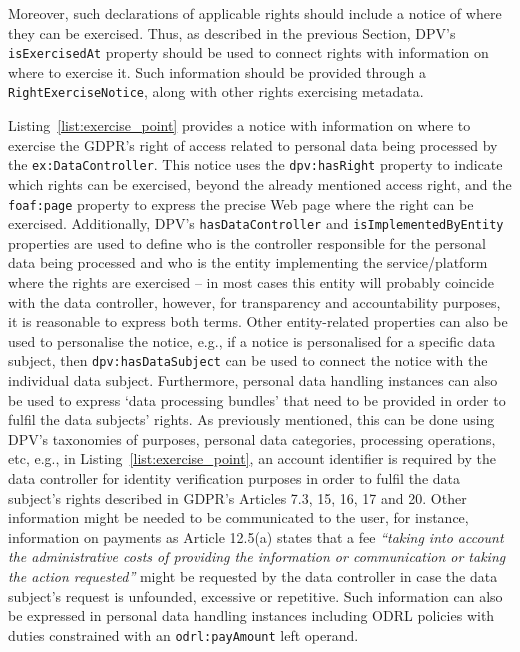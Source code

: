 Moreover, such declarations of applicable rights should include a notice of where they can be exercised.
Thus, as described in the previous Section, DPV’s \texttt{isExercisedAt} property should be used to connect rights with information on where to exercise it.
Such information should be provided through a \texttt{RightExerciseNotice}, along with other rights exercising metadata.

Listing~\ref{list:exercise_point} provides a notice with information on where to exercise the GDPR's right of access related to personal data being processed by the \texttt{ex:DataController}.
This notice uses the \texttt{dpv:hasRight} property to indicate which rights can be exercised, beyond the already mentioned access right, and the \texttt{foaf:page} property to express the precise Web page where the right can be exercised.
Additionally, DPV's \texttt{hasDataController} and \texttt{isImplementedByEntity} properties are used to define who is the controller responsible for the personal data being processed and who is the entity implementing the service/platform where the rights are exercised -- in most cases this entity will probably coincide with the data controller, however, for transparency and accountability purposes, it is reasonable to express both terms.
Other entity-related properties can also be used to personalise the notice, e.g., if a notice is personalised for a specific data subject, then \texttt{dpv:hasDataSubject} can be used to connect the notice with the individual data subject. 
Furthermore, personal data handling instances can also be used to express `data processing bundles' that need to be provided in order to fulfil the data subjects' rights.
As previously mentioned, this can be done using DPV's taxonomies of purposes, personal data categories, processing operations, etc, e.g., in Listing~\ref{list:exercise_point}, an account identifier is required by the data controller for identity verification purposes in order to fulfil the data subject's rights described in GDPR's Articles 7.3, 15, 16, 17 and 20.
Other information might be needed to be communicated to the user, for instance, information on payments as Article 12.5(a) states that a fee \textit{``taking into account the administrative costs of providing the information or communication or taking the action requested''} might be requested by the data controller in case the data subject's request is unfounded, excessive or repetitive.
Such information can also be expressed in personal data handling instances including ODRL policies with duties constrained with an \texttt{odrl:payAmount} left operand.

